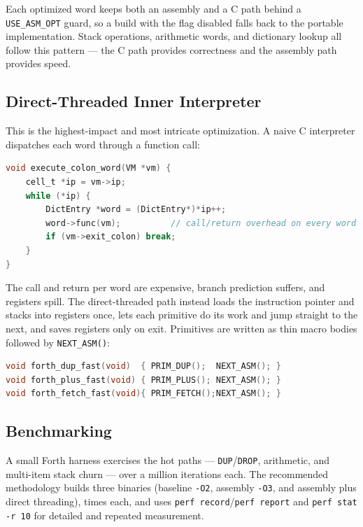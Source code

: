 Each optimized word keeps both an assembly and a C path behind a
\texttt{USE\_ASM\_OPT} guard, so a build with the flag disabled falls back to
the portable implementation. Stack operations, arithmetic words, and dictionary
lookup all follow this pattern --- the C path provides correctness and the
assembly path provides speed.

\subsection{Direct-Threaded Inner Interpreter}

This is the highest-impact and most intricate optimization. A naive C
interpreter dispatches each word through a function call:

\begin{lstlisting}[language=C]
void execute_colon_word(VM *vm) {
    cell_t *ip = vm->ip;
    while (*ip) {
        DictEntry *word = (DictEntry*)*ip++;
        word->func(vm);          // call/return overhead on every word
        if (vm->exit_colon) break;
    }
}
\end{lstlisting}

The call and return per word are expensive, branch prediction suffers, and
registers spill. The direct-threaded path instead loads the instruction
pointer and stacks into registers once, lets each primitive do its work and
jump straight to the next, and saves registers only on exit. Primitives are
written as thin macro bodies followed by \texttt{NEXT\_ASM()}:

\begin{lstlisting}[language=C]
void forth_dup_fast(void)  { PRIM_DUP();  NEXT_ASM(); }
void forth_plus_fast(void) { PRIM_PLUS(); NEXT_ASM(); }
void forth_fetch_fast(void){ PRIM_FETCH();NEXT_ASM(); }
\end{lstlisting}

\subsection{Benchmarking}

A small Forth harness exercises the hot paths --- \texttt{DUP}/\texttt{DROP},
arithmetic, and multi-item stack churn --- over a million iterations each. The
recommended methodology builds three binaries (baseline \texttt{-O2}, assembly
\texttt{-O3}, and assembly plus direct threading), times each, and uses
\texttt{perf record}/\texttt{perf report} and \texttt{perf stat -r 10} for
detailed and repeated measurement.

